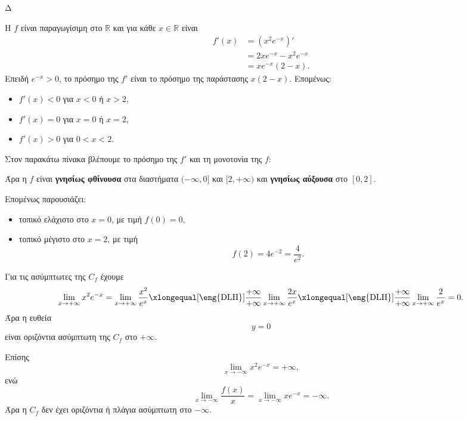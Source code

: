 \begin{thema}{Δ}
\begin{erwthma}
\item Η $f$ είναι παραγωγίσιμη στο $\mathbb{R}$ και για κάθε $x\in\mathbb{R}$ είναι
\begin{align*}
f'(x)
&=(x^2e^{-x})'\\
&=2xe^{-x}-x^2e^{-x}\\
&=xe^{-x}(2-x).
\end{align*}
Επειδή $e^{-x}>0$, το πρόσημο της $f'$ είναι το πρόσημο της παράστασης $x(2-x)$. Επομένως:
\begin{itemize}
\item $f'(x)<0$ για $x<0$ ή $x>2$,
\item $f'(x)=0$ για $x=0$ ή $x=2$,
\item $f'(x)>0$ για $0<x<2$.
\end{itemize}
Στον παρακάτω πίνακα βλέπουμε το πρόσημο της $f'$ και τη μονοτονία της $f$:
\begin{center}
\end{center}

Άρα η $f$ είναι \textbf{γνησίως φθίνουσα} στα διαστήματα $(-\infty,0]$ και $[2,+\infty)$ και \textbf{γνησίως αύξουσα} στο $[0,2]$.

Επομένως παρουσιάζει:
\begin{itemize}
\item τοπικό ελάχιστο στο $x=0$, με τιμή $f(0)=0$,
\item τοπικό μέγιστο στο $x=2$, με τιμή
\[
f(2)=4e^{-2}=\frac{4}{e^2}.
\]
\end{itemize}

Για τις ασύμπτωτες της $C_f$ έχουμε
\[
\lim_{x\to+\infty}x^2e^{-x}
=\lim_{x\to+\infty}\frac{x^2}{e^x}
\xlongequal[\text{\eng{DLH}}]{\frac{+\infty}{+\infty}}
\lim_{x\to+\infty}\frac{2x}{e^x}
\xlongequal[\text{\eng{DLH}}]{\frac{+\infty}{+\infty}}
\lim_{x\to+\infty}\frac{2}{e^x}
=0.
\]
Άρα η ευθεία
\[
{y=0}
\]
είναι οριζόντια ασύμπτωτη της $C_f$ στο $+\infty$.

Επίσης
\[
\lim_{x\to-\infty}x^2e^{-x}=+\infty,
\]
ενώ
\[
\lim_{x\to-\infty}\frac{f(x)}{x}
=\lim_{x\to-\infty}xe^{-x}
=-\infty.
\]
Άρα η $C_f$ δεν έχει οριζόντια ή πλάγια ασύμπτωτη στο $-\infty$.


\end{erwthma}
\end{thema}
